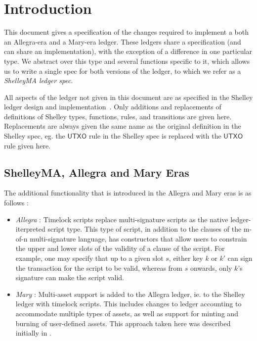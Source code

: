 \section{Introduction}

This document gives a specification of the changes
required to implement a both an Allegra-era and a Mary-era ledger. These ledgers share
a specification (and can share an implementation), with the exception of
a difference in one particular type. We abstract over this type and several
functions specific to it, which allows us to write a single spec for both versions of the
ledger, to which we refer as a \emph{ShelleyMA ledger spec}.

All aspects of the ledger not given in this document are as specified
in the Shelley ledger design and implementation~\cite{shelley_spec}.
Only additions and replacements of definitions of Shelley types, functions, rules, and transitions
are given here. Replacements are always given the same name as the
original definition in the Shelley spec, eg. the $\mathsf{UTXO}$ rule in the
Shelley spec is replaced with the $\mathsf{UTXO}$ rule given here.

\subsection{ShelleyMA, Allegra and Mary Eras}

The additional functionality that is introduced in the Allegra and Mary eras
is as follows :

\begin{itemize}
  \item \emph{Allegra} : Timelock scripts replace multi-signature scripts as the native
  ledger-iterpreted script type. This type of script, in addition to the
  clauses of the m-of-n multi-signature language, has constructors that
  allow users to constrain the upper and lower slots of the validity of a
  clause of the script. For example, one may specify that up to a given slot $s$,
  either key $k$ or $k'$ can sign the transaction for the script to be valid,
  whereas from $s$ onwards, only $k$'s signature can make the script valid.

  \item \emph{Mary} : Multi-asset support is added to the Allegra ledger, ie.
  to the Shelley ledger with timelock scripts. This includes changes to
  ledger accounting to accommodate multiple types of assets, as well as
  support for minting and burning of user-defined assets. This approach
  taken here was described initially in \cite{utxo_ma}.
\end{itemize}

